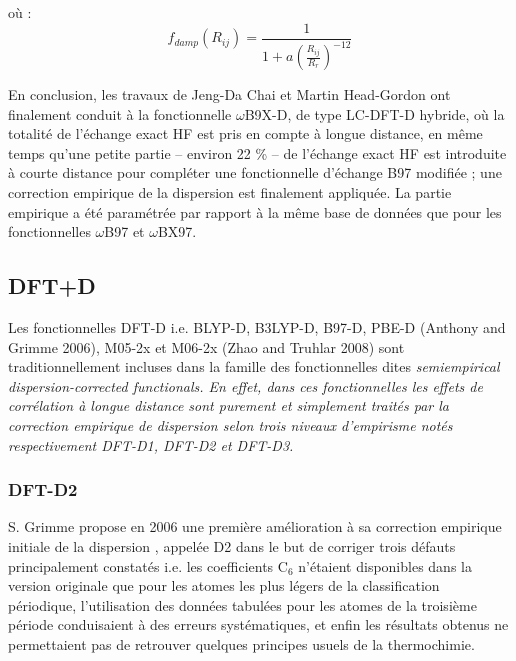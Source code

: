 \noindent où :
\begin{equation}
f_{damp} (R_{ij})=\frac{1}{1+a(\frac{R_{ij}}{R_{r}})^{-12}}
\end{equation}

En conclusion, les travaux de Jeng-Da Chai et Martin Head-Gordon ont finalement conduit à la fonctionnelle $\omega$B9X-D, de type LC-DFT-D hybride, où la totalité de l'échange exact HF est pris en compte à longue distance, en même temps qu'une petite partie -- environ 22 \% -- de l'échange exact HF est introduite à courte distance pour compléter une fonctionnelle d'échange B97 modifiée ; une correction empirique de la dispersion est finalement appliquée. La partie empirique a été paramétrée par rapport à la même base de données que pour les fonctionnelles $\omega$B97 et $\omega$BX97.

\subsection{DFT+D}

Les fonctionnelles DFT-D i.e. BLYP-D, B3LYP-D, B97-D, PBE-D (Anthony and Grimme 2006), M05-2x et M06-2x (Zhao and Truhlar 2008) sont traditionnellement incluses dans la famille des fonctionnelles dites \it{semiempirical dispersion-corrected functionals}. En effet, dans ces fonctionnelles les effets de corrélation à longue distance sont purement et simplement traités par la correction empirique de dispersion selon trois niveaux d’empirisme notés respectivement DFT-D1, DFT-D2 et DFT-D3. 


\subsubsection{DFT-D2}

S. Grimme \cite{grimme2006semiempirical} propose en 2006 une première amélioration à sa correction empirique initiale de la dispersion \cite{grimme2004accurate}, appelée D2 dans le but de corriger trois défauts principalement constatés i.e. les coefficients C$_{6}$ n’étaient disponibles dans la version originale que pour les atomes les plus légers de la classification périodique, l’utilisation des données tabulées pour les atomes de la troisième période conduisaient à des erreurs systématiques, et enfin les résultats obtenus ne permettaient pas de retrouver quelques principes usuels de la thermochimie.  

